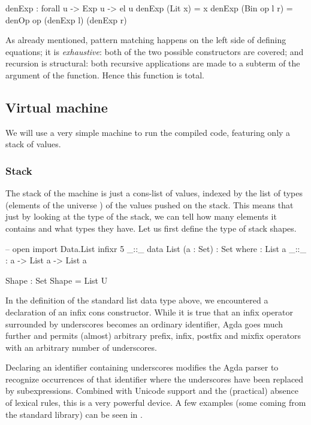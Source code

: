 \begin{code}
  denExp : forall {u} -> Exp u -> el u
  denExp (Lit x) = x
  denExp (Bin op l r) = denOp op (denExp l) (denExp r)
\end{code}\label{sec:simple-denExp}

\noindent As already mentioned, pattern matching happens on the left side of defining equations;
it is \emph{exhaustive}: both of the two possible constructors are covered; and recursion
is structural: both recursive applications are made to a subterm of the argument of the function.
Hence this function is total.

\subsection{Virtual machine}

We will use a very simple machine to run the compiled code, featuring only a stack
of values.

\subsubsection{Stack}

The stack of the machine is just a cons-list of values, indexed by the list
of types (elements of the universe ) of the values pushed on the stack.
This means that just by looking at the type of the stack, we can tell how many
elements it contains and what types they have. Let us first define the type
of stack shapes.
\begin{code}
  -- open import Data.List
  infixr 5 _::_
  data List (a : Set) : Set where
    \NIL : List a
    _::_ : a -> List a -> List a
\end{code}
\begin{code}
  Shape : Set
  Shape = List U
\end{code}
\label{sec:fixity} In the definition of the standard list data type above,
we encountered a declaration of an infix cons constructor. While it is true that
an infix operator surrounded by underscores becomes an ordinary identifier,
Agda goes much further and permits (almost) arbitrary prefix, infix, postfix
and mixfix operators with an arbitrary number of underscores.

Declaring an identifier containing underscores modifies the Agda parser
to recognize occurrences of that identifier where the underscores have been
replaced by subexpressions. Combined with Unicode support and the (practical) absence
of lexical rules, this is a very powerful device. A few examples (some coming
from the standard library) can be seen
in .

